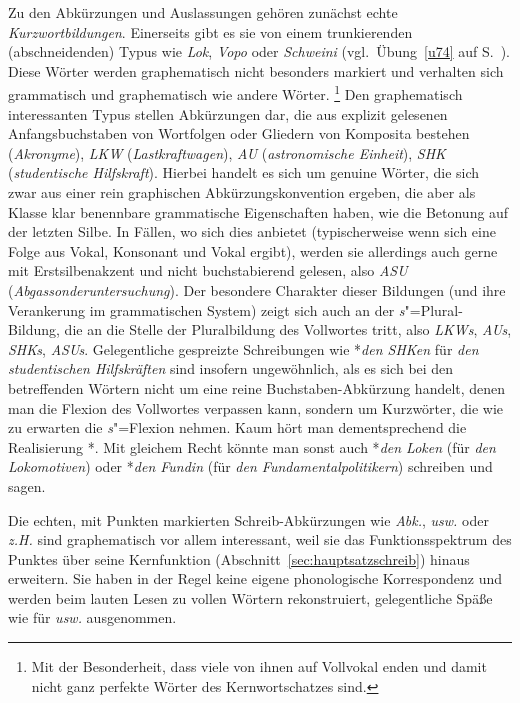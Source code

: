Zu den Abkürzungen und Auslassungen gehören zunächst echte \textit{Kurzwortbildungen}.
Einerseits gibt es sie von einem trunkierenden (abschneidenden) Typus wie \textit{Lok}, \textit{Vopo} oder \textit{Schweini} (vgl.\ Übung~\ref{u74} auf S.~\pageref{u74}).
Diese Wörter werden graphematisch nicht besonders markiert und verhalten sich grammatisch und graphematisch wie andere Wörter.%
\footnote{Mit der Besonderheit, dass viele von ihnen auf Vollvokal enden und damit nicht ganz perfekte Wörter des Kernwortschatzes sind.}
Den graphematisch interessanten Typus stellen Abkürzungen dar, die aus explizit gelesenen Anfangsbuchstaben von Wortfolgen oder Gliedern von Komposita bestehen (\textit{Akronyme}), \zB \textit{LKW} \textipa{[PElkave:]} (\textit{Lastkraftwagen}), \textit{AU} \textipa{[Pa:Pu:]} (\textit{astronomische Einheit}), \textit{SHK} \textipa{[PEshaka:]} (\textit{studentische Hilfskraft}).
Hierbei handelt es sich um genuine Wörter, die sich zwar aus einer rein graphischen Abkürzungskonvention ergeben, die aber als Klasse klar benennbare grammatische Eigenschaften haben, wie \zB die Betonung auf der letzten Silbe.
In Fällen, wo sich dies anbietet (typischerweise wenn sich eine Folge aus Vokal, Konsonant und Vokal ergibt), werden sie allerdings auch gerne mit Erstsilbenakzent und nicht buchstabierend gelesen, also \textit{ASU} \textipa{[Pa:zu]} (\textit{Abgassonderuntersuchung}).
Der besondere Charakter dieser Bildungen (und ihre Verankerung im grammatischen System) zeigt sich auch an der \textit{s}"=Plural-Bildung, die an die Stelle der Pluralbildung des Vollwortes tritt, also \textit{LKWs}, \textit{AUs}, \textit{SHKs}, \textit{ASUs}.
Gelegentliche gespreizte Schreibungen wie *\textit{den SHKen} für \textit{den studentischen Hilfskräften} sind insofern ungewöhnlich, als es sich bei den betreffenden Wörtern nicht um eine reine Buchstaben-Abkürzung handelt, denen man die Flexion des Vollwortes verpassen kann, sondern um Kurzwörter, die wie zu erwarten die \textit{s}"=Flexion nehmen.
Kaum hört man dementsprechend die Realisierung *\textipa{[PEshaka:@n]}.
Mit gleichem Recht könnte man sonst auch *\textit{den Loken} (für \textit{den Lokomotiven}) oder *\textit{den Fundin} (für \textit{den Fundamentalpolitikern}) schreiben und sagen.

Die echten, mit Punkten markierten Schreib-Abkürzungen wie \textit{Abk.}, \textit{usw.} oder \textit{z.H.} sind graphematisch vor allem interessant, weil sie das Funktionsspektrum des Punktes über seine Kernfunktion (Abschnitt~\ref{sec:hauptsatzschreib}) hinaus erweitern.
Sie haben in der Regel keine eigene phonologische Korrespondenz und werden beim lauten Lesen zu vollen Wörtern rekonstruiert, gelegentliche Späße wie \zB \textipa{[Puz@v@]} für \textit{usw.} ausgenommen.

